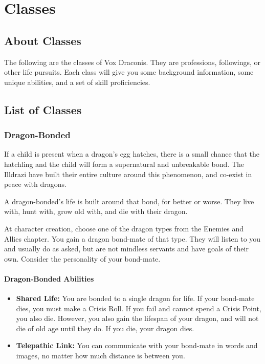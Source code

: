 \chapter{Classes}

\begin{multicols}{2}

\section{About Classes}

The following are the classes of Vox Draconis. They are professions,
followings, or other life pursuits. Each class will give you some
background information, some unique abilities, and a set of skill
proficiencies.

\section{List of Classes}

\subsection{Dragon-Bonded}

If a child is present when a dragon's egg hatches, there is a small
chance that the hatchling and the child will form a supernatural and
unbreakable bond. The Illdrazi have built their entire culture around
this phenomenon, and co-exist in peace with dragons.

A dragon-bonded's life is built around that bond, for better or worse.
They live with, hunt with, grow old with, and die with their dragon.

At character creation, choose one of the dragon types from the
Enemies and Allies chapter. You gain a dragon bond-mate of that
type. They will listen to you and usually do as asked, but are
not mindless servants and have goals of their own. Consider the
personality of your bond-mate.

\subsubsection{Dragon-Bonded Abilities}

\begin{itemize}
  \item \textbf{Shared Life:} You are bonded to a single dragon for
    life. If your bond-mate dies, you must make a Crisis Roll. If you
    fail and cannot spend a Crisis Point, you also die. However, you
    also gain the lifespan of your dragon, and will not die of old age until
    they do. If you die, your dragon dies.
  \item \textbf{Telepathic Link:} You can communicate with your bond-mate in
    words and images, no matter how much distance is between you.
\end{itemize}


\end{multicols}
